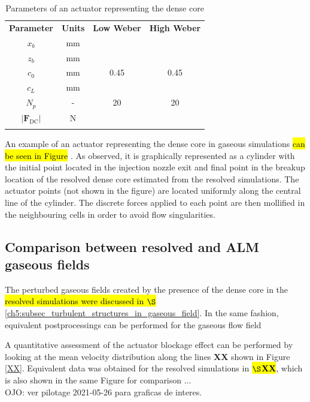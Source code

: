\begin{table}[!h]
\centering
\caption{Parameters of an actuator representing the dense core}
\begin{tabular}{cccc}
\thickhline
\textbf{Parameter} & \textbf{Units} & \textbf{Low Weber} &  \textbf{High Weber} \\
\thickhline
$x_b$ & mm & & \\
$z_b$ & mm & & \\
$c_0$ & mm & 0.45 & 0.45 \\
$c_L$ & mm & & \\
$N_p$ & - & 20 & 20 \\
$| \textbf{F}_\mathrm{DC} |$ & N &  & \\
\thickhline
\end{tabular}
\label{tab:jicf_lgs_ALM_parameters}
\end{table}

An example of an actuator representing the dense core in gaseous simulations \hl{can be seen in Figure }. As observed, it is graphically represented as a cylinder with the initial point located in the injection nozzle exit and final point in the breakup location of the resolved dense core estimated from the resolved simulations. The actuator points (not shown in the figure) are located uniformly along the central line of the cylinder. The discrete forces applied to each point are then mollified in the neighbouring cells in order to avoid flow singularities.

\subsection{Comparison between resolved and ALM gaseous fields}

The perturbed gaseous fields created by the presence of the dense core in the \hl{resolved simulations were discussed in $\S$}\ref{ch5:subsec_turbulent_structures_in_gaseous_field}. In the same fashion, equivalent postprocessings can be performed for the gaseous flow field 

A quantitative assessment of the actuator blockage effect can be performed by looking at the mean velocity distribution along the lines \textbf{XX} shown in Figure \ref{XX}. Equivalent data was obtained for the resolved simulations in \hl{\textbf{$\S$XX}}, which is also shown in the same Figure for comparison ... \\

OJO: ver pilotage 2021-05-26 para graficas de interes.


